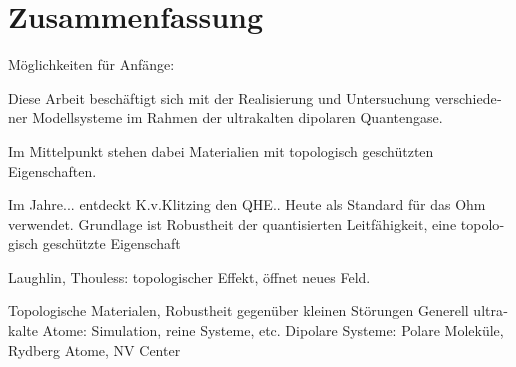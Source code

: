 \chapter*{Zusammenfassung}

\begin{otherlanguage}{ngerman}

Möglichkeiten für Anfänge:

Diese Arbeit beschäftigt sich mit der Realisierung und Untersuchung
verschiedener Modellsysteme im Rahmen der ultrakalten dipolaren
Quantengase.

Im Mittelpunkt stehen dabei Materialien mit topologisch geschützten
Eigenschaften.

Im Jahre... entdeckt K.v.Klitzing den QHE.. Heute als Standard für
das Ohm verwendet. Grundlage ist Robustheit der quantisierten Leitfähigkeit,
eine topologisch geschützte Eigenschaft

Laughlin, Thouless: topologischer Effekt, öffnet neues Feld.

Topologische Materialen, Robustheit gegenüber kleinen Störungen
Generell ultrakalte Atome: Simulation, reine Systeme, etc.
Dipolare Systeme: Polare Moleküle, Rydberg Atome, NV Center

\end{otherlanguage}
